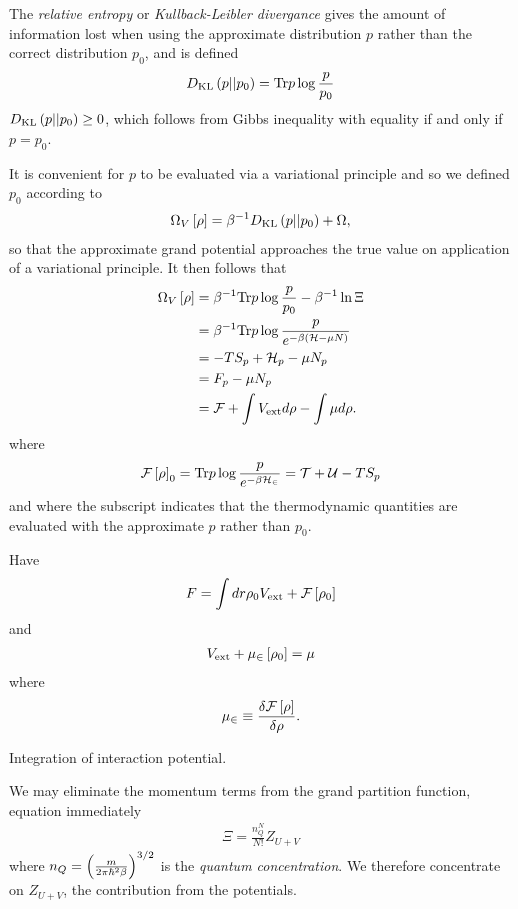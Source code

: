 The {\em relative entropy } or {\em Kullback-Leibler divergance} gives the amount of information lost 
when using the approximate distribution  $p$ rather than the correct distribution $p_0$,
and is defined
\begin{align}
  D_{\text {KL}}\left( {p}||{p_0} \right) = \textrm{Tr} p \log \frac{p}{p_0} \label{eqn:nuc:KLD}
\end{align}
$D_{\text {KL}}\left( {p}||{p_0} \right) \ge 0$, which follows from Gibbs inequality with equality if and only if $p=p_0$.

It is convenient for $p$ to be evaluated via a variational principle and so we defined $p_0$ according to 
\begin{align}
 \Omega_V\left[ \rho \right] = \beta^{-1}D_{\text {KL}}\left( {p}||{p_0} \right)+   \Omega, 
\end{align}
so that the approximate grand potential approaches the true value on application of a variational principle.
It then follows that 
\begin{align}
  \Omega_V\left[ \rho \right] &= \beta^{-1} \textrm{Tr} p \log \frac{p}{p_0}  - \beta^{-1}\ln \Xi \\
  &= \beta^{-1} \textrm{Tr} p \log \frac{p}{e^{-\beta\left( {\cal H} - \mu N \right)}}\\
  &= - T S_p + {\cal H}_p - \mu N_p \\
  &= F_p - \mu N_p\\
  &= {\cal F} + \int V_{\text{ext}} d\rho - \int \mu d \rho.
\end{align}
where 
\begin{align}
 {\cal F}\left[ \rho \right]_0 = \textrm{Tr} p \log\frac{p}{e^{-\beta{\cal H}_\in}} = {\cal{T}} + {\cal{U}} - TS_p
\end{align}
and
where the subscript indicates that the thermodynamic quantities are evaluated with the approximate $p$ rather than $p_0$.




Have 
\begin{align}
F = \int dr \rho_0 V_{\text{ext}} + {\cal F}\left[ \rho_0 \right]
\end{align}
and 
\begin{align}
  V_{\text{ext}} + \mu_\in\left[ \rho_0 \right] = \mu
\end{align}
where
\begin{align}
  \mu_\in \equiv \frac{\delta {\cal F}\left[ \rho \right]}{\delta \rho}.
\end{align}


Integration of interaction potential.



We may eliminate the momentum terms from the grand partition function, equation  immediately
\begin{align}
  \Xi = \frac{n_Q^N}{N!} Z_{U+V} 
\end{align}
where $n_Q = \left( \frac{m}{2\pi\hbar^2 \beta} \right)^{3/2}$ is the {\em quantum concentration}.
We therefore concentrate on $Z_{U+V}$,
the contribution from the potentials.





